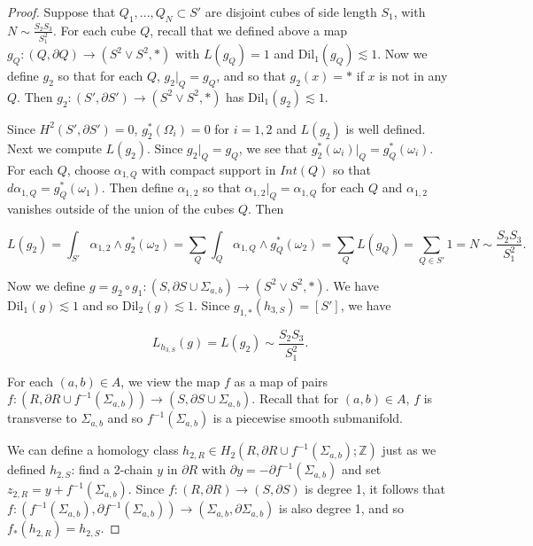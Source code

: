 \documentclass{amsart}
\newtheorem*{theorem 1}{Theorem 1}
\newtheorem*{theorem 2}{Theorem 2}
\newtheorem*{theorem 3}{Theorem 3}
\numberwithin{equation}{section}
\newcommand{\Dil}{\textrm{Dil}}
\newcommand{\ZZ}{\mathbb{Z}}
\begin{document}
\begin{proof}
Suppose that $Q_1,  ...,  Q_N \subset S'$ are disjoint cubes of side length $S_1$,  with $N \sim  \frac{S_2 S_3}{S_1^2}$.   For each cube $Q$,  recall that we defined above a map
$g_Q: (Q, \partial Q) \rightarrow (S^2 \vee S^2, *)$ with $L(g_Q) = 1$ and $\Dil_1(g_Q) \lesssim 1$.   Now we define $g_2$ so that for each $Q$,  $g_2 |_Q = g_Q$,  and so that $g_2(x) = *$ if $x$ is not in any $Q$.   Then $g_2: (S', \partial S') \rightarrow (S^2 \vee S^2, *)$ has $\Dil_1(g_2) \lesssim 1$.

Since $H^2(S',  \partial S') = 0$,  $g_2^*(\Omega_i) = 0$ for $i=1,2$ and $L(g_2)$ is well defined.   Next we compute $L(g_2)$.   Since $g_2 |_Q = g_Q$,  we see that $g_2^*(\omega_i) |_Q = g_Q^*(\omega_i)$.   For each $Q$,  choose $\alpha_{1,Q}$ with compact support in $Int(Q)$ so that $d \alpha_{1,Q} = g_Q^{*}(\omega_1)$.   Then define $\alpha_{1,2}$ so that $\alpha_{1,2} |_Q = \alpha_{1,Q}$ for each $Q$ and $\alpha_{1,2}$ vanishes outside of the union of the cubes $Q$.    Then

$$ L(g_2) = \int_{S'} \alpha_{1,2} \wedge g_2^*(\omega_2) = \sum_{Q} \int_Q \alpha_{1,Q} \wedge g_Q^*(\omega_2) = \sum_{Q} L(g_Q) = \sum_{Q \in S'} 1 = N \sim \frac{S_2 S_3}{S_1^2}. $$

Now we define $g = g_2 \circ g_1: (S,  \partial S \cup \Sigma_{a,b}) \rightarrow (S^2 \vee S^2,  *)$.    We have $\Dil_1(g) \lesssim 1$ and so $\Dil_2(g) \lesssim 1$.   Since $g_{1, *}(h_{3,S}) = [S']$,  we have

\begin{equation}  L_{h_{3,S}}(g)  = L(g_2) \sim \frac{S_2 S_3}{S_1^2}.   \end{equation}

For each $(a,b) \in A$, we view the map $f$ as a map of pairs $f: (R,  \partial R \cup f^{-1} (\Sigma_{a,b})) \rightarrow (S,  \partial S \cup \Sigma_{a,b})$.   Recall that for $(a,b) \in A$,  $f$ is transverse to $\Sigma_{a,b}$ and so $f^{-1}(\Sigma_{a,b})$ is a piecewise smooth submanifold.    

We can define a homology class $h_{2,R} \in H_2(R,  \partial R \cup f^{-1}(\Sigma_{a,b}); \ZZ)$ just as we defined $h_{2,S}$: find a 2-chain $y$ in $\partial R$ with $\partial y = - \partial f^{-1}(\Sigma_{a,b})$ and set $z_{2,R} = y + f^{-1}(\Sigma_{a,b})$.   Since $f: (R,  \partial R) \rightarrow (S,  \partial S)$ is degree 1,  it follows that $f: (f^{-1}(\Sigma_{a,b}),  \partial f^{-1}(\Sigma_{a,b})) \rightarrow (\Sigma_{a,b},  \partial \Sigma_{a,b})$ is also degree 1,  and so $f_*(h_{2,R}) = h_{2, S}$.  


\end{proof}
\end{document}
